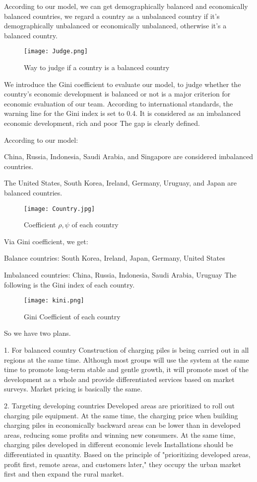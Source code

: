 \documentclass[12pt]{article}  %
\begin{document}
According to our model, we can get demographically balanced and economically balanced countries, we regard a country as a unbalanced country if it's demographically unbalanced or economically unbalanced, otherwise it's a balanced country.

\begin{figure}[H]
	\centering
	\texttt{[image: Judge.png]}
	\caption{Way to judge if a country is a balanced country}\label{fig:12}
\end{figure}

We introduce the Gini coefficient to evaluate our model, to judge whether the country's economic development is balanced or not is a major criterion for economic evaluation of our team. According to international standards, the warning line for the Gini index is set to 0.4. It is considered as an imbalanced economic development, rich and poor The gap is clearly defined.

According to our model:

 China, Russia, Indonesia, Saudi Arabia, and Singapore are considered imbalanced countries. 
 
 The United States, South Korea, Ireland, Germany, Uruguay, and Japan are balanced countries. 
\begin{figure}[H]
	\centering
	\texttt{[image: Country.jpg]}
	\caption{Coefficient ${\rho, \psi}$ of each country}\label{fig:13}
\end{figure}
Via Gini coefficient, we get:

Balance countries: South Korea, Ireland, Japan, Germany, United States

Imbalanced countries: China, Russia, Indonesia, Saudi Arabia, Uruguay
The following is the Gini index of each country.
\begin{figure}[H]
	\centering
	\texttt{[image: kini.png]}
	\caption{Gini Coefficient of each country}\label{fig:14}
\end{figure}

So we have two plans.

1. For balanced country
Construction of charging piles is being carried out in all regions at the same time. Although most groups will use the system at the same time to promote long-term stable and gentle growth, it will promote most of the development as a whole and provide differentiated services based on market surveys. Market pricing is basically the same.

2. Targeting developing countries
Developed areas are prioritized to roll out charging pile equipment. At the same time, the charging price when building charging piles in economically backward areas can be lower than in developed areas, reducing some profits and winning new consumers. At the same time, charging piles developed in different economic levels Installations should be differentiated in quantity. Based on the principle of "prioritizing developed areas, profit first, remote areas, and customers later," they occupy the urban market first and then expand the rural market.
\end{document}
